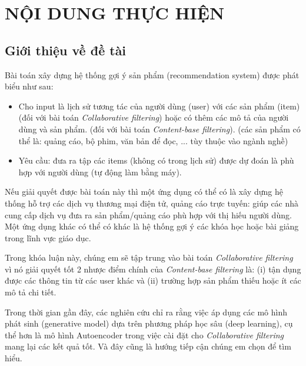 \documentclass{article}[14pt]
\begin{document}
    \section{NỘI DUNG THỰC HIỆN}
    {

    
    \subsection{Giới thiệu về đề tài}
    
    
      Bài toán xây dựng hệ thống gợi ý sản phẩm (recommendation system) được phát biểu như sau:
      \begin{itemize}
          \item Cho input là lịch sử tương tác của người dùng (user)  với 
          các sản phẩm (item) (đối với bài toán \textit{Collaborative filtering}) 
          hoặc có thêm các mô tả của người dùng và sản phẩm. 
          (đối với bài toán \textit{Content-base filtering}).
          (các sản phẩm có thể là: quảng cáo, bộ phim, văn bản để đọc, ... tùy thuộc vào ngành nghề)
          \item Yêu cầu: đưa ra tập các items (không có trong lịch sử) 
          được dự đoán là phù hợp với người dùng (tự động làm bằng máy).
      \end{itemize}
      Nếu giải quyết được bài toán này thì một ứng dụng có thể có là xây dựng 
      hệ thống hỗ trợ các dịch vụ thương mại điện tử, quảng cáo trực tuyến: 
      giúp các nhà cung cấp dịch vụ đưa ra sản phẩm/quảng cáo phù hợp với 
      thị hiếu người dùng. Một ứng dụng khác có thể có khác là hệ thống gợi ý các 
      khóa học hoặc bài giảng trong lĩnh vực giáo dục.

      Trong khóa luận này, chúng em sẽ tập trung vào bài toán 
      \textit{Collaborative filtering} vì nó giải quyết tốt 2 nhược điểm chính 
      của \textit{Content-base filtering} là: 
      (i) tận dụng được các thông tin từ các user khác và 
      (ii) trường hợp sản phẩm thiếu hoặc ít các mô tả chi tiết.
      
      Trong thời gian gần đây, các nghiên cứu chỉ ra rằng việc áp dụng các 
      mô hình phát sinh (generative model) dựa trên phương pháp học sâu 
      (deep learning), cụ thể hơn là mô hình Autoencoder trong việc cài đặt cho 
      \textit{Collaborative filtering} mang lại các kết quả tốt. 
      Và đây cũng là hướng tiếp cận chúng em chọn để tìm hiểu.

}
\end{document}
